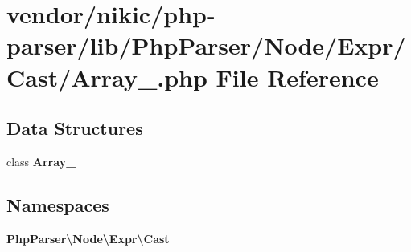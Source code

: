 \section{vendor/nikic/php-\/parser/lib/\+Php\+Parser/\+Node/\+Expr/\+Cast/\+Array\+\_\+.php File Reference}
\label{_cast_2_array___8php}
\subsection*{Data Structures}
\begin{DoxyCompactItemize}
\item 
class {\bf Array\+\_\+}
\end{DoxyCompactItemize}
\subsection*{Namespaces}
\begin{DoxyCompactItemize}
\item 
 {\bf Php\+Parser\textbackslash{}\+Node\textbackslash{}\+Expr\textbackslash{}\+Cast}
\end{DoxyCompactItemize}
